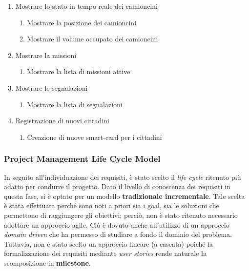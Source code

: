 \begin{itemize}
\begin{enumerate}[label*=\arabic*.]
\begin{enumerate}[label*=\arabic*.]
\begin{enumerate}[label*=\arabic*.]
            \end{enumerate}
            \item Mostrare lo stato in tempo reale dei camioncini
            \begin{enumerate}[label*=\arabic*.]
                \item Mostrare la posizione dei camioncini
                \item Mostrare il volume occupato dei camioncini
            \end{enumerate}
            \item Mostrare la missioni
            \begin{enumerate}[label*=\arabic*.]
                \item Mostrare la lista di missioni attive
            \end{enumerate}
            \item Mostrare le segnalazioni
            \begin{enumerate}[label*=\arabic*.]
                \item Mostrare la lista di segnalazioni
            \end{enumerate}
            \item Registrazione di nuovi cittadini
            \begin{enumerate}[label*=\arabic*.]
                \item Creazione di nuove smart-card per i cittadini
            \end{enumerate}
        \end{enumerate}
    \end{enumerate}
\end{itemize}

\subsubsection{Project Management Life Cycle Model}
In seguito all'individuazione dei requisiti, è stato scelto il \textit{life cycle} ritenuto più adatto per condurre il progetto. Dato il livello di conoscenza dei requisiti in questa fase, si è optato per un modello \textbf{tradizionale incrementale}.
Tale scelta è stata effettuata perché sono noti a priori sia i goal, sia le soluzioni che permettono di raggiungere gli obiettivi; perciò, non è stato ritenuto necessario adottare un approccio agile.
Ciò è dovuto anche all'utilizzo di un approccio \textit{domain driven} che ha permesso di studiare a fondo il dominio del problema.
Tuttavia, non è stato scelto un approccio lineare (a cascata) poiché la formalizzazione dei requisiti mediante \textit{user stories} rende naturale la scomposizione in \textbf{milestone}.

